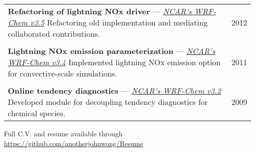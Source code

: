 \documentclass[centered,11pt,line]{res}
\makeatletter
\newcommand{\tabulated}{\begin{tabular}{@{}p{5.5in}p{0.8in}}}
\newcommand{\shrink}{\vspace{-.15in}}
\makeatother
\begin{document}
\begin{resume}
		\tabulated
			{\bf Refactoring of lightning NOx driver} --- \href{http://www.mmm.ucar.edu/wrf/users/}{\it NCAR's WRF-Chem v3.5} \newline
			Refactoring old implementation and mediating collaborated contributions. & 2012 \\ \\
			{\bf Lightning NOx emission parameterization} --- \href{http://www.mmm.ucar.edu/wrf/users/}{\it NCAR's WRF-Chem v3.4} \newline
			Implemented lightning NOx emission option for convective-scale simulations. & 2011 \\ \\
			{\bf Online tendency diagnostics} --- \href{http://www.mmm.ucar.edu/wrf/users/}{\it NCAR's WRF-Chem v3.2} \newline
			Developed module for decoupling tendency diagnostics for chemical species. & 2009
		\end{tabular}\shrink
		
	\end{resume} \vspace{.3in}
	\fullline
	\hspace{-.5in}Full C.V. and resume available through \url{https://github.com/anotherjohnwong/Resume}
\end{document}
